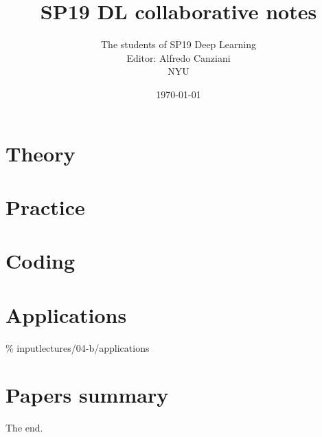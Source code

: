 \documentclass[oneside]{book}
\title{SP19 DL collaborative notes}
\author{
  The students of SP19 Deep Learning\\
  Editor: Alfredo Canziani\\
  NYU
}
\date{\today}
\begin{document}
\maketitle




\tableofcontents

\part{Theory}\label{prt:theory}
% 
% 
% 
% 
% 
% 
% 
% 
% 


\part{Practice}\label{prt:practice}
% 
% 
% 
% 

% 
% 
% 

\part{Coding}\label{prt:coding}
% 
% 
% 


\part{Applications}\label{prt:apps}
\% input{lectures/04-b/applications}

\part{Papers summary}\label{prt:papers}

The end.  %


\clearpage
\end{document}
